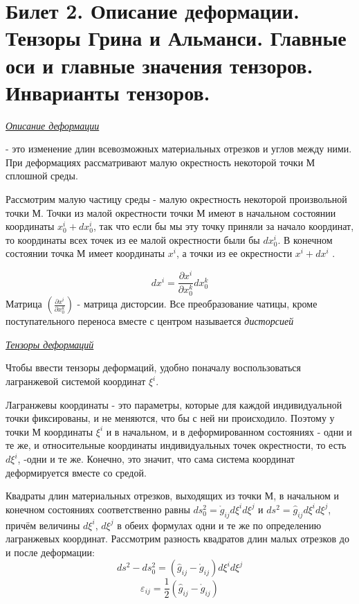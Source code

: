 \newpage
\section{Билет 2. Описание деформации. Тензоры Грина и Альманси. Главные оси и главные значения тензоров. Инварианты тензоров.}

\begin{center}
  \textit{\underline{Описание деформации}}
\end{center}

 - это изменение длин всевозможных материальных отрезков и углов между ними. При деформациях рассматривают малую окрестность некоторой точки М сплошной среды.

Рассмотрим малую частицу среды - малую окрестность некоторой произвольной точки М. Точки из малой окрестности точки М имеют в начальном состоянии координаты $x_0^i+dx_0^i$, так что если бы мы эту точку приняли за начало координат, то координаты всех точек из ее малой окрестности были бы $dx_0^i$. В конечном состоянии точка М имеет координаты $x^i$, а точки из ее окрестности $x^i+dx^i$ .

$$dx^i=\frac{\partial x^i}{\partial x_0^k}dx_0^k$$
Матрица $\left( \frac {\partial x^i}{\partial x_0^k}\right)$ - матрица дисторсии. Все преобразование чатицы, кроме поступательного переноса вместе с центром называется \textit{дисторсией}

\begin{center}
  \textit{\underline{Тензоры деформаций}}
\end{center}
Чтобы ввести тензоры деформаций, удобно поначалу воспользоваться лагранжевой системой координат $\xi^i$.

Лагранжевы координаты - это параметры, которые для каждой индивидуальной точки фиксированы, и не меняются, что бы с ней ни происходило. Поэтому у точки М координаты $\xi^i$ и в начальном, и в деформированном состояниях - одни и те же, и относительные координаты индивидуальных точек окрестности, то есть $d\xi^i$, -одни и те же. Конечно, это значит, что сама система координат деформируется вместе со средой.

Квадраты длин материальных отрезков, выходящих из точки М, в начальном и конечном состояниях соответственно равны $ds_0^2 = \mathring{g}_{ij}d\xi^id\xi^j$ и $ds^2 = \hat{g}_{ij}d\xi^id\xi^j$, причём величины $d\xi^i$, $d\xi^j$ в обеих формулах одни и те же по определению лагранжевых координат. Рассмотрим разность квадратов длин малых отрезков до и после деформации: $$ds^2 - ds_0^2 = (\hat{g}_{ij} - \mathring{g}_{ij})d\xi^id\xi^j$$
$$\varepsilon_{ij} = \frac{1}{2}(\hat{g}_{ij} - \mathring{g}_{ij})$$


